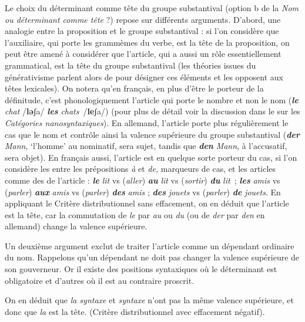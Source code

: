 Le choix du déterminant comme tête du groupe substantival (option b de la  \textit{Nom ou déterminant comme tête} ?) repose sur différents arguments. D’abord, une analogie entre la proposition et le groupe substantival : si l’on considère que l’auxiliaire, qui porte les grammèmes du verbe, est la tête de la proposition, on peut être amené à considérer que l’article, qui a aussi un rôle essentiellement grammatical, est la tête du groupe substantival (les théories issues du générativisme parlent alors de  pour désigner ces éléments et les opposent aux têtes lexicales). On notera qu’en français, en plus d’être le porteur de la définitude, c’est phonologiquement l’article qui porte le nombre et non le nom (\textbf{\textit{le}} \textit{chat} /\textbf{lǝ}ʃa/  \textbf{\textit{les}} \textit{chats}~/\textbf{le}ʃa/) (pour plus de détail voir la discussion dans le  sur les \textit{Catégories nanosyntaxiques}). En allemand, l’article porte plus régulièrement le cas que le nom et contrôle ainsi la valence supérieure du groupe substantival (\textbf{\textit{der}} \textit{Mann}, ‘l’homme’ au nominatif, sera sujet, tandis que \textbf{\textit{den}} \textit{Mann}, à l’accusatif, sera objet). En français aussi, l’article est en quelque sorte porteur du cas, si l’on considère les  entre les prépositions \textit{à} et \textit{de,} marqueurs de cas, et les articles comme des  de l’article : \textbf{\textit{le}} \textit{lit} vs (\textit{aller}) \textbf{\textit{au}} \textit{lit} vs (\textit{sortir}) \textbf{\textit{du}} \textit{lit~}; \textbf{\textit{les}} \textit{amis} vs (\textit{parler}) \textbf{\textit{aux}} \textit{amis} vs (\textit{parler}) \textbf{\textit{des}} \textit{amis} ; \textbf{\textit{des}} \textit{jouets} vs (\textit{parler}) \textbf{\textit{de}} \textit{jouets}. En appliquant le Critère distributionnel sans effacement, on en déduit que l’article est la tête, car la commutation de \textit{le} par \textit{au} ou \textit{du} (ou de \textit{der} par \textit{den} en allemand) change la valence supérieure.

Un deuxième argument exclut de traiter l’article comme un dépendant ordinaire du nom. Rappelons qu’un dépendant ne doit pas changer la valence supérieure de son gouverneur. Or il existe des positions syntaxiques où le déterminant est obligatoire et d’autres où il est au contraire proscrit.

\ea
  \z
\z
On en déduit que \textit{la syntaxe} et \textit{syntaxe} n’ont pas la même valence supérieure, et donc que \textit{la} est la tête. (Critère distributionnel avec effacement négatif).

